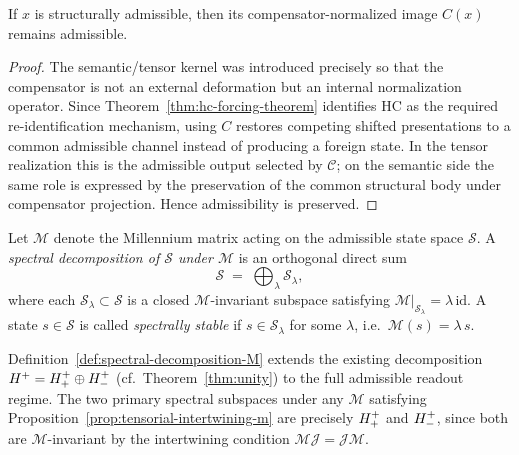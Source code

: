 \begin{lemma}
\label{lem:hc-admissibility-lemma}
If $x$ is structurally admissible, then its compensator-normalized image $C(x)$
remains admissible.
\end{lemma}

\begin{proof}
The semantic/tensor kernel was introduced precisely so that the compensator is
not an external deformation but an internal normalization operator. Since
Theorem~\ref{thm:hc-forcing-theorem} identifies HC as the required
re-identification mechanism, using $C$ restores competing shifted presentations
to a common admissible channel instead of producing a foreign state. In the
tensor realization this is the admissible output selected by $\mathcal C$; on
the semantic side the same role is expressed by the preservation of the common
structural body under compensator projection. Hence admissibility is preserved.
\end{proof}


\begin{definition}
\label{def:spectral-decomposition-M}
Let $\mathcal{M}$ denote the Millennium matrix acting on the admissible state
space $\mathcal{S}$. A \emph{spectral decomposition of $\mathcal{S}$ under
$\mathcal{M}$} is an orthogonal direct sum
\[
  \mathcal{S} \;=\; \bigoplus_{\lambda} \mathcal{S}_\lambda,
\]
where each $\mathcal{S}_\lambda \subset \mathcal{S}$ is a closed
$\mathcal{M}$-invariant subspace satisfying
$\mathcal{M}|_{\mathcal{S}_\lambda} = \lambda\,\mathrm{id}$.
A state $s \in \mathcal{S}$ is called \emph{spectrally stable} if
$s \in \mathcal{S}_\lambda$ for some $\lambda$, i.e.\ $\mathcal{M}(s) =
\lambda\,s$.
\end{definition}

\begin{remark}
Definition~\ref{def:spectral-decomposition-M} extends the existing
decomposition $H^+ = H^+_+ \oplus H^+_-$
(cf.\ Theorem~\ref{thm:unity}) to the full admissible readout regime.
The two primary spectral subspaces under any $\mathcal{M}$ satisfying
Proposition~\ref{prop:tensorial-intertwining-m} are precisely $H^+_+$
and $H^+_-$, since both are $\mathcal{M}$-invariant by the intertwining
condition $\mathcal{M}\mathcal{J} = \mathcal{J}\mathcal{M}$.
\end{remark}

